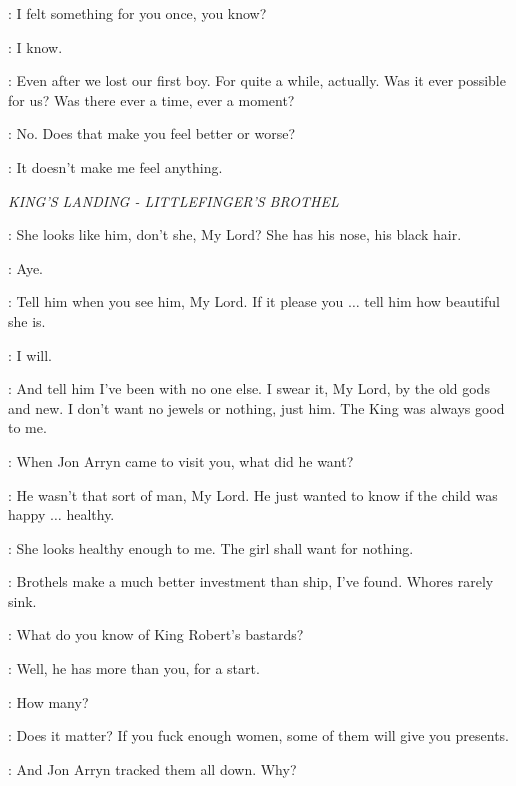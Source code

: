 \CERSEI: I felt something for you once, you know? 

\ROBERT: I know. 

\CERSEI: Even after we lost our first boy. For quite a while, actually. Was it ever possible for us? Was there ever a time, ever a moment? 

\ROBERT: No. Does that make you feel better or worse? 

\CERSEI: It doesn't make me feel anything. 


\scene

\textit{KING'S LANDING - LITTLEFINGER'S BROTHEL} 


\MHAEGEN: She looks like him, don't she, My Lord? She has his nose, his black hair. 

\NED: Aye. 

\MHAEGEN: Tell him when you see him, My Lord. If it please you $\ldots$ tell him how beautiful she is. 

\NED: I will. 

\MHAEGEN: And tell him I've been with no one else. I swear it, My Lord, by the old gods and new. I don't want no jewels or nothing, just him. The King was always good to me. 

\NED: When Jon Arryn came to visit you, what did he want? 

\MHAEGEN: He wasn't that sort of man, My Lord. He just wanted to know if the child was happy $\ldots$ healthy. 

\NED: She looks healthy enough to me. The girl shall want for nothing. 


\LITTLEFINGER: Brothels make a much better investment than ship, I've found. Whores rarely sink. 

\NED: What do you know of King Robert's bastards? 

\LITTLEFINGER: Well, he has more than you, for a start. 

\NED: How many? 

\LITTLEFINGER: Does it matter? If you fuck enough women, some of them will give you presents. 

\NED: And Jon Arryn tracked them all down. Why? 

